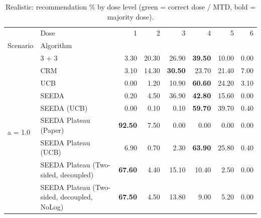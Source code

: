 \begin{table}[H]
\centering
\caption{Realistic: recommendation \% by dose level (green = correct dose / MTD, bold = majority dose).}
\label{tab:real_rec_by_dose}
\begin{tabular}{llrrrrrr}
\toprule
 & Dose & 1 & 2 & 3 & 4 & 5 & 6 \\
Scenario & Algorithm &  &  &  &  &  &  \\
\midrule
\multirow[c]{9}{*}{a = 1.0} & 3 + 3 & 3.30 & 20.30 & {\cellcolor[HTML]{C8E6C9}} 26.90 & \bfseries 39.50 & 10.00 & 0.00 \\
 & CRM & 3.10 & 14.30 & {\cellcolor[HTML]{C8E6C9}} \bfseries 30.50 & 23.70 & 21.40 & 7.00 \\
 & UCB & 0.00 & 1.20 & {\cellcolor[HTML]{C8E6C9}} 10.90 & \bfseries 60.60 & 24.20 & 3.10 \\
 & SEEDA & 0.20 & 4.50 & {\cellcolor[HTML]{C8E6C9}} 36.90 & \bfseries 42.80 & 15.60 & 0.00 \\
 & SEEDA (UCB) & 0.00 & 0.10 & {\cellcolor[HTML]{C8E6C9}} 0.10 & \bfseries 59.70 & 39.70 & 0.40 \\
 & SEEDA Plateau (Paper) & \bfseries 92.50 & 7.50 & {\cellcolor[HTML]{C8E6C9}} 0.00 & 0.00 & 0.00 & 0.00 \\
 & SEEDA Plateau (UCB) & 6.90 & 0.70 & {\cellcolor[HTML]{C8E6C9}} 2.30 & \bfseries 63.90 & 25.80 & 0.40 \\
 & SEEDA Plateau (Two-sided, decoupled) & \bfseries 67.60 & 4.40 & {\cellcolor[HTML]{C8E6C9}} 15.10 & 10.40 & 2.50 & 0.00 \\
 & SEEDA Plateau (Two-sided, decoupled, NoLog) & \bfseries 67.50 & 4.50 & {\cellcolor[HTML]{C8E6C9}} 13.80 & 9.00 & 5.20 & 0.00 \\
\bottomrule
\end{tabular}
\end{table}
